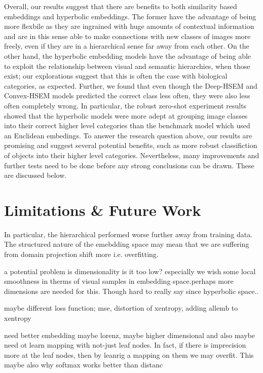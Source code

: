\documentclass[12pt]{report}
\begin{document}
Overall, our results suggest that there are benefits to both similarity based embeddings and hyperbolic embeddings. The former have the advantage of being more flexbile as they are ingrained with huge amounts of contextual information and are in this sense able to make connections with new classes of images more freely, even if they are in a hierarchical sense far away from each other. On the other hand, the hyperbolic embedding models have the advantage of being able to exploit the relationship between visual and semantic hierarchies, when those exist; our explorations suggest that this is often the case with biological categories, as expected. Further, we found that even though the Deep-HSEM and Convex-HSEM models predicted the correct class less often, they were also less often completely wrong. In particular, the robust zero-shot experiment results showed that the hyperbolic models were more adept at grouping image classes into their correct higher level categories than the benchmark model which used an Euclidean embedings. To answer the research question above, our results are promising and suggest several potential benefits, such as more robust classifiction of objects into their higher level categories. Nevertheless, many improvements and further tests need to be done before any strong conclusions can be drawn. These are discussed below.





\section{Limitations \& Future Work}
In particular, the hierarchical performed worse further away from training data. The structured nature of the emebdding space may mean that we are suffering from domain projection shift more i.e. overfitting.



a potential problem is dimensionality is it too low? especially we wish some local smoothness in therms of visual samples in embedding space.perhaps more dimensions are needed for this. Though hard to really say since hyperbolic space..

maybe different loss function; mse, distortion of xentropy, adding allemb to xentropy

need better embedding maybe lorenz, maybe higher dimensional and also maybe need ot learn mapping with not-just leaf nodes. In fact, if there is imprecision more at the leaf nodes, then by leanrig a mapping on them we may overfit. This maybe also why softmax works better than distanc
\end{document}
